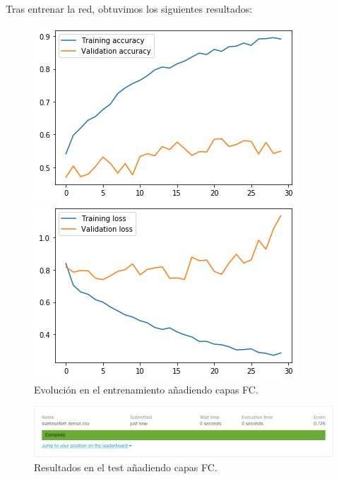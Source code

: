 \documentclass[11pt,a4paper]{article}
\begin{document}
Tras entrenar la red, obtuvimos los siguientes resultados:

\begin{figure}[H]
\centering
\begin{minipage}{0.5\textwidth}
  \centering
  \includegraphics[scale=0.5]{img/accuracy-dense.png}
\end{minipage}%
\begin{minipage}{0.5\textwidth}
  \centering
  \includegraphics[scale=0.5]{img/loss-dense.png}
\end{minipage}
\caption{Evolución en el entrenamiento añadiendo capas FC.}
\label{fig:graph-dense}
\end{figure}

\begin{figure}[H]
    \centering
    \includegraphics[scale=0.55]{img/siameseNet-dense.png}
    \caption{Resultados en el test añadiendo capas FC.}
    \label{fig:test-dense}
\end{figure}
\end{document}
